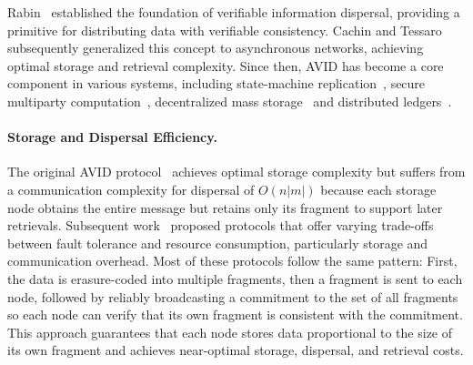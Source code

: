 \documentclass[sigconf,screen]{acmart}
\begin{document}

Rabin~\cite{rabin1990} established the foundation of verifiable information dispersal, providing a primitive for distributing data with verifiable consistency.
Cachin and Tessaro~\cite{cachin2005} subsequently generalized this concept to asynchronous networks, achieving optimal storage and retrieval complexity.
Since then, AVID has become a core component in various systems, including state-machine replication~\cite{das2021,hendricks2007}, secure multiparty computation~\cite{lu2019}, decentralized mass storage~\cite{damgaard2019,fisch2019,juels2007,goren2025} and distributed ledgers~\cite{cecchetti2019,nazirkhanova2022,yang2022}.

\paragraph*{Storage and Dispersal Efficiency.} 
The original AVID protocol~\cite{cachin2005} achieves optimal storage complexity but suffers from a communication complexity for dispersal of $O(n|m|)$ because each storage node obtains the entire message but retains only its fragment to support later retrievals.
Subsequent work~\cite{alhaddad2021,das2021,hendricks2007,yang2022} proposed protocols that offer varying trade-offs between fault tolerance and resource consumption, particularly storage and communication overhead.
Most of these protocols follow the same pattern: First, the data is erasure-coded into multiple fragments, then a fragment is sent to each node, followed by reliably broadcasting a commitment to the set of all fragments so each node can verify that its own fragment is consistent with the commitment. This approach guarantees that each node stores data proportional to the size of its own fragment and achieves near-optimal storage, dispersal, and retrieval costs.
\end{document}

